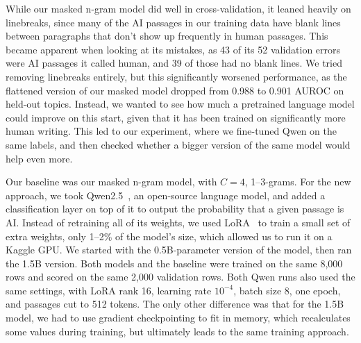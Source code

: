 While our masked n-gram model did well in cross-validation, it leaned heavily on linebreaks, since many of the AI passages in our training data have blank lines between paragraphs that don't show up frequently in human passages.
This became apparent when looking at its mistakes, as 43 of its 52 validation errors were AI passages it called human, and 39 of those had no blank lines.
We tried removing linebreaks entirely, but this significantly worsened performance, as the flattened version of our masked model dropped from 0.988 to 0.901 AUROC on held-out topics.
Instead, we wanted to see how much a pretrained language model could improve on this start, given that it has been trained on significantly more human writing.
This led to our experiment, where we fine-tuned Qwen on the same labels, and then checked whether a bigger version of the same model would help even more.

Our baseline was our masked n-gram model, with $C=4$, 1--3-grams.
For the new approach, we took Qwen2.5~\cite{qwen2024qwen25}, an open-source language model, and added a classification layer on top of it to output the probability that a given passage is AI.
Instead of retraining all of its weights, we used LoRA~\cite{hu2022lora} to train a small set of extra weights, only 1--2\% of the model's size, which allowed us to run it on a Kaggle GPU.
We started with the 0.5B-parameter version of the model, then ran the 1.5B version.
Both models and the baseline were trained on the same 8{,}000 rows and scored on the same 2{,}000 validation rows.
Both Qwen runs also used the same settings, with LoRA rank 16, learning rate $10^{-4}$, batch size 8, one epoch, and passages cut to 512 tokens.
The only other difference was that for the 1.5B model, we had to use gradient checkpointing to fit in memory, which recalculates some values during training, but ultimately leads to the same training approach.


